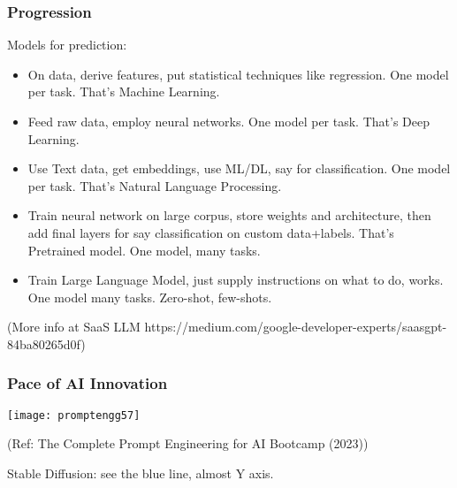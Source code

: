 




\begin{frame}[fragile]\frametitle{Progression}

Models for prediction:

\begin{itemize}
\item On data, derive features, put statistical techniques like regression. One model per task. That's Machine Learning.
\item Feed raw data, employ neural networks. One model per task. That's Deep Learning.
\item Use Text data, get embeddings, use ML/DL, say for classification. One model per task. That's Natural Language Processing.
\item Train neural network on large corpus, store weights and architecture, then add final layers for say classification on custom data+labels. That's Pretrained model. One model, many tasks.
\item Train Large Language Model, just supply instructions on what to do, works. One model many tasks. Zero-shot, few-shots.
\end{itemize}

{\tiny (More info at SaaS LLM https://medium.com/google-developer-experts/saasgpt-84ba80265d0f)}

\end{frame}



\begin{frame}[fragile]\frametitle{Pace of AI Innovation}

\begin{center}
\texttt{[image: promptengg57]}

{\tiny (Ref: The Complete Prompt Engineering for AI Bootcamp (2023))}

\end{center}

Stable Diffusion: see the blue line, almost Y axis.
				
\end{frame}


